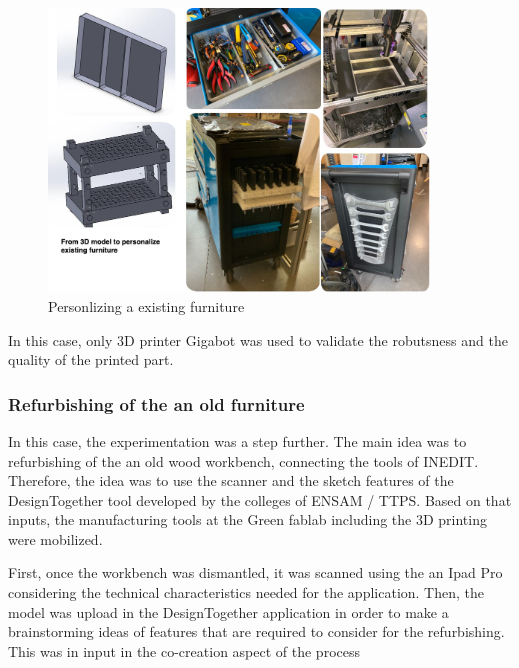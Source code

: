 \documentclass[
  11pt,
]{article}
\begin{document}
\begin{figure}[H]

{\centering \includegraphics[width=0.9\textwidth,height=\textheight]{figures/Demo-01.jpg}

}

\caption{\label{fig-demo1}Personlizing a existing furniture}

\end{figure}

In this case, only 3D printer Gigabot was used to validate the
robutsness and the quality of the printed part.

\hypertarget{refurbishing-of-the-an-old-furniture}{%
\subsubsection{Refurbishing of the an old
furniture}\label{refurbishing-of-the-an-old-furniture}}

In this case, the experimentation was a step further. The main idea was
to refurbishing of the an old wood workbench, connecting the tools of
INEDIT. Therefore, the idea was to use the scanner and the sketch
features of the DesignTogether tool developed by the colleges of ENSAM /
TTPS. Based on that inputs, the manufacturing tools at the Green fablab
including the 3D printing were mobilized.

First, once the workbench was dismantled, it was scanned using the an
Ipad Pro considering the technical characteristics needed for the
application. Then, the model was upload in the DesignTogether
application in order to make a brainstorming ideas of features that are
required to consider for the refurbishing. This was in input in the
co-creation aspect of the process
\end{document}
